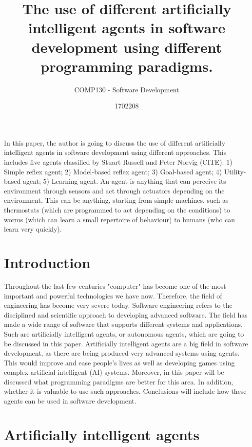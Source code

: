 \documentclass{scrartcl}
\title{The use of different artificially intelligent agents in software development using different programming paradigms.}
\subtitle{COMP130 - Software Development}
\author{1702208}
\begin{document}
\maketitle

In this paper, the author is going to discuss the use of different artificially intelligent agents in software development using different approaches.
This includes five agents classified by Stuart Russell and Peter Norvig (CITE):
1) Simple reflex agent;
2) Model-based reflex agent;
3) Goal-based agent;
4) Utility-based agent;
5) Learning agent.
An agent is anything that can perceive its environment through sensors and act through actuators depending on the environment. 
This can be anything, starting from simple machines, such as thermostats (which are programmed to act depending on the conditions) 
to worms (which can learn a small repertoire of behaviour) to humans (who can learn very quickly).

\section{Introduction}

Throughout the last few centuries "computer" has become one of the most important and powerful technologies we have now. 
Therefore, the field of engineering has become very severe today. 
Software engineering refers to the disciplined and scientific approach to developing advanced software. 
The field has made a wide range of software that supports different systems and applications. 
Such are artificially intelligent agents, or autonomous agents, which are going to be discussed in this paper. 
Artificially intelligent agents are a big field in software development, as there are being produced very advanced systems using agents.
This would improve and ease people's lives as well as developing games using complex artificial intelligent (AI) systems.
Moreover, in this paper will be discussed what programming paradigms are better for this area.
In addition, whether it is valuable to use such approaches.
Conclusions will include how these agents can be used in software development. %

\section{Artificially intelligent agents}
\end{document}
